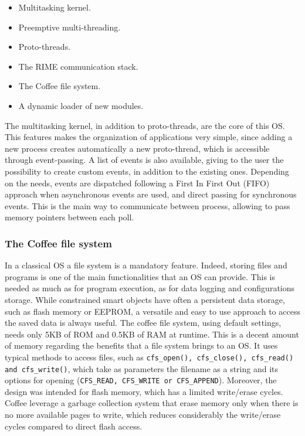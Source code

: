 \begin{itemize}
	\item Multitasking kernel.
	\item Preemptive multi-threading.
	\item Proto-threads\cite{dunkels2006protothreads}.
	\item The RIME communication stack\cite{dunkels2007rime}.
	\item The Coffee file system\cite{tsiftes09enabling}.
	\item A dynamic loader of new modules\cite{dunkels06runtime}.
\end{itemize}

The multitasking kernel, in addition to proto-threads, are the core of this OS.
This features makes the organization of applications very simple, since adding a new process creates automatically a new proto-thread, which is accessible through event-passing.
A list of events is also available, giving to the user the possibility to create custom events, in addition to the existing ones.
Depending on the needs, events are dispatched following a First In First Out (FIFO) approach when asynchronous events are used, and direct passing for synchronous events.
This is the main way to communicate between process, allowing to pass memory pointers between each poll.

\subsubsection{The Coffee file system}
In a classical OS a file system is a mandatory feature.
Indeed, storing files and programs is one of the main functionalities that an OS can provide.
This is needed as much as for program execution, as for data logging and configurations storage.
While constrained smart objects have often a persistent data storage, such as flash memory or EEPROM, a versatile and easy to use approach to access the saved data is always useful.
The coffee file system, using default settings, needs only 5KB of ROM and 0.5KB of RAM at runtime.
This is a decent amount of memory regarding the benefits that a file system brings to an OS.
It uses typical methods to access files, such as \texttt{cfs\_open(), cfs\_close(), cfs\_read() and cfs\_write()}, which take as parameters the filename as a string and its options for opening (\texttt{CFS\_READ, CFS\_WRITE or CFS\_APPEND}).
Moreover, the design was intended for flash memory, which has a limited write/erase cycles.
Coffee leverage a garbage collection system that erase memory only when there is no more available pages to write, which reduces considerably the write/erase cycles compared to direct flash access.

